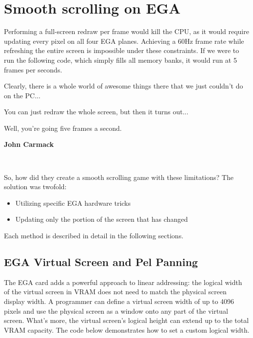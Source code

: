 \documentclass[book.tex]{subfiles}
\begin{document}
\section{Smooth scrolling on EGA}
\label{section:adaptive_tile_refresh}
Performing a full-screen redraw per frame would kill the CPU, as it would require updating every pixel on all four EGA planes. Achieving a 60Hz frame rate while refreshing the entire screen is impossible under these constraints. If we were to run the following code, which simply fills all memory banks, it would run at 5 frames per seconds.\\

\par
\begin{minipage}{\textwidth}
  
  \end{minipage}
  \label{ega_write}

\bigskip
\par
\begin{fancyquotes}
Clearly, there is a whole world of awesome things there that we just couldn't do on the PC...\\

\par 
You can just redraw the whole screen, but then it turns out...\\
\par
Well, you're going five frames a second.\\

\par
\textbf{John Carmack\protect\footnotemark}
\end{fancyquotes}\\
\addtocounter{footnote}{-1}

\pagebreak
So, how did they create a smooth scrolling game with these limitations? The solution was twofold:
\begin{itemize}
  \item Utilizing specific EGA hardware tricks
  \item Updating only the portion of the screen that has changed
\end{itemize}

\par
Each method is described in detail in the following sections.

\subsection{EGA Virtual Screen and Pel Panning}
\label{section:EGA_virtual_screen}
The EGA card adds a powerful approach to linear addressing: the logical width of the virtual screen in VRAM does not need to match the physical screen display width. A programmer can define a virtual screen width of up to 4096 pixels and use the physical screen as a window onto any part of the virtual screen. What's more, the virtual screen's logical height can extend up to the total VRAM capacity. The code below demonstrates how to set a custom logical width.\\
\end{document}
